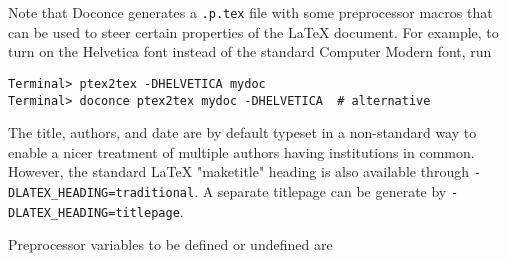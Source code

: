 \documentclass[%
oneside,                 %
final,                   %
10pt]{article}
\begin{document}
Note that Doconce generates a {\fontsize{10pt}{10pt}\Verb!.p.tex!} file with some preprocessor macros
that can be used to steer certain properties of the {\LaTeX} document.
For example, to turn on the Helvetica font instead of the standard
Computer Modern font, run
\vspace{4pt}
\begin{Verbatim}[numbers=none,frame=lines,fontsize=\fontsize{9pt}{9pt},labelposition=topline,framesep=2.5mm,framerule=0.7pt]
Terminal> ptex2tex -DHELVETICA mydoc
Terminal> doconce ptex2tex mydoc -DHELVETICA  # alternative
\end{Verbatim}
The title, authors, and date are by default typeset in a non-standard
way to enable a nicer treatment of multiple authors having
institutions in common. However, the standard {\LaTeX} "maketitle" heading
is also available through {\fontsize{10pt}{10pt}\Verb!-DLATEX_HEADING=traditional!}.
A separate titlepage can be generate by
{\fontsize{10pt}{10pt}\Verb!-DLATEX_HEADING=titlepage!}.

Preprocessor variables to be defined or undefined are
\end{document}
